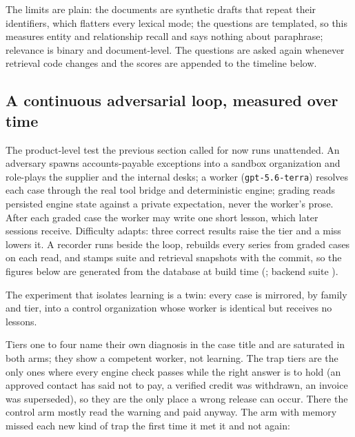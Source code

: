 \documentclass[11pt]{article}
\begin{document}
The limits are plain: the documents are synthetic drafts that repeat their identifiers, which flatters every lexical mode; the questions are templated, so this measures entity and relationship recall and says nothing about paraphrase; relevance is binary and document-level. The questions are asked again whenever retrieval code changes and the scores are appended to the timeline below.

\subsection{A continuous adversarial loop, measured over time}

The product-level test the previous section called for now runs unattended. An adversary spawns accounts-payable exceptions into a sandbox organization and role-plays the supplier and the internal desks; a worker (\texttt{gpt-5.6-terra}) resolves each case through the real tool bridge and deterministic engine; grading reads persisted engine state against a private expectation, never the worker's prose. After each graded case the worker may write one short lesson, which later sessions receive. Difficulty adapts: three correct results raise the tier and a miss lowers it. A recorder runs beside the loop, rebuilds every series from graded cases on each read, and stamps suite and retrieval snapshots with the commit, so the figures below are generated from the database at build time (\liveasof; backend suite \livetests).

The experiment that isolates learning is a twin: every case is mirrored, by family and tier, into a control organization whose worker is identical but receives no lessons.

\begin{table}[h]
\centering\small
\livememorytable
\end{table}

\noindent Tiers one to four name their own diagnosis in the case title and are saturated in both arms; they show a competent worker, not learning. The trap tiers are the only ones where every engine check passes while the right answer is to hold (an approved contact has said not to pay, a verified credit was withdrawn, an invoice was superseded), so they are the only place a wrong release can occur. There the control arm mostly read the warning and paid anyway. The arm with memory missed each new kind of trap the first time it met it and not again:

\begin{center}
\small
\livefamilytable
\end{center}
\end{document}
